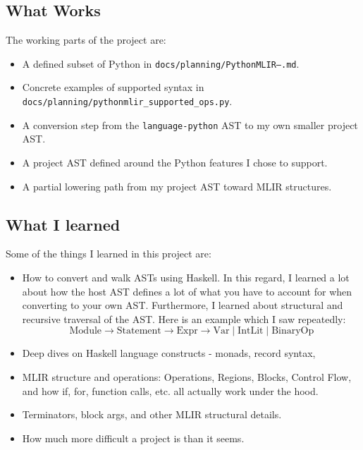 \documentclass[11pt]{article}
\begin{document}
\subsection{What Works}
The working parts of the project are:

\begin{itemize}
	\item A defined subset of Python in \texttt{docs/planning/PythonMLIR--.md}.
	\item Concrete examples of supported syntax in
	      \texttt{docs/planning/pythonmlir\_supported\_ops.py}.
	\item A conversion step from the \texttt{language-python} AST to my own smaller
	      project AST.
	\item A project AST defined around the Python features I chose to support.
	\item A partial lowering path from my project AST toward MLIR structures.
\end{itemize}

\subsection{What I learned}
Some of the things I learned in this project are:

\begin{itemize}
	\item How to convert and walk ASTs using Haskell. In this regard, I learned a lot
	      about how the host AST defines a lot of what you have to account for when
	      converting to your own AST. Furthermore, I learned about structural and
	      recursive traversal of the AST. Here is an example which I saw repeatedly:
	      \[
		      \text{Module}
		      \rightarrow
		      \text{Statement}
		      \rightarrow
		      \text{Expr}
		      \rightarrow
		      \text{Var} \mid \text{IntLit} \mid \text{BinaryOp}
	      \]
	\item Deep dives on Haskell language constructs - monads, record syntax,

	\item MLIR structure and operations: Operations, Regions, Blocks, Control Flow, and
	      how if, for, function calls, etc. all actually work under the hood.

	\item Terminators, block args, and other MLIR structural details.

	\item How much more difficult a project is than it seems.
\end{itemize}
\end{document}
